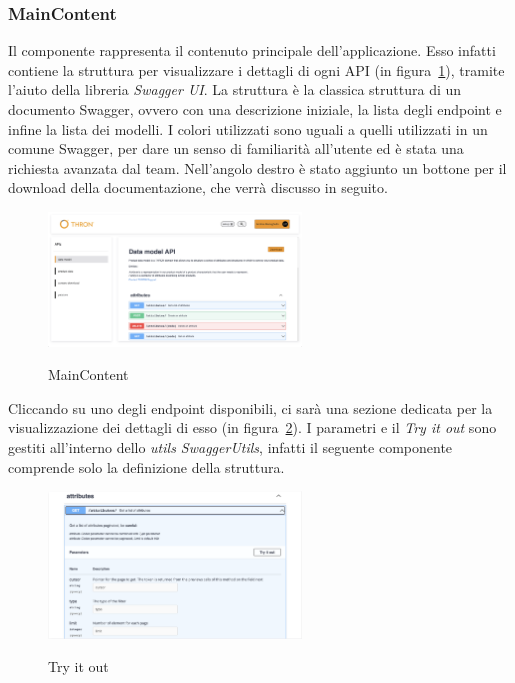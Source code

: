 \subsubsection{MainContent}\label{subsubsec:main-content}
Il componente rappresenta il contenuto principale dell'applicazione. Esso infatti contiene la struttura per visualizzare i dettagli di ogni API (in figura~\ref{fig:main-content}), tramite l'aiuto 
della libreria \textit{Swagger UI}.
La struttura è la classica struttura di un documento Swagger, ovvero con una descrizione iniziale, la lista degli endpoint e infine la lista dei modelli.
I colori utilizzati sono uguali a quelli utilizzati in un comune Swagger, per dare un senso di familiarità all'utente ed è stata una richiesta avanzata dal team.
Nell'angolo destro è stato aggiunto un bottone per il download della documentazione, che verrà discusso in seguito.
\begin{figure}[ht]
  \centering
  \includegraphics[width=0.6\textwidth, alt={Sezione per la visualizzazione dei dettagli di un API}]{images/frontend/DataModelView.jpg}
  \caption{MainContent}\label{fig:main-content}
\end{figure}
\pagebreak
Cliccando su uno degli endpoint disponibili, ci sarà una sezione dedicata per la visualizzazione dei dettagli di esso (in figura~\ref{fig:try-it-out}).
I parametri e il \textit{Try it out} sono gestiti all'interno dello \textit{utils SwaggerUtils}, infatti il seguente componente comprende solo la definizione
della struttura.

\begin{figure}[ht]
  \centering
  \includegraphics[width=0.6\textwidth, alt={Sezione try it out di un endpoint}]{images/frontend/TryItOut.jpg}
  \caption{Try it out}\label{fig:try-it-out}
\end{figure}

